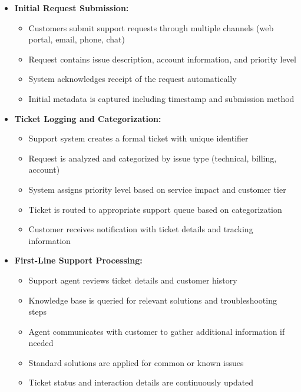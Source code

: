 \begin{itemize}
    \item \textbf{Initial Request Submission:}
    \begin{itemize}
        \item Customers submit support requests through multiple channels (web portal, email, phone, chat)
        \item Request contains issue description, account information, and priority level
        \item System acknowledges receipt of the request automatically
        \item Initial metadata is captured including timestamp and submission method
    \end{itemize}

    \item \textbf{Ticket Logging and Categorization:}
    \begin{itemize}
        \item Support system creates a formal ticket with unique identifier
        \item Request is analyzed and categorized by issue type (technical, billing, account)
        \item System assigns priority level based on service impact and customer tier
        \item Ticket is routed to appropriate support queue based on categorization
        \item Customer receives notification with ticket details and tracking information
    \end{itemize}

    \item \textbf{First-Line Support Processing:}
    \begin{itemize}
        \item Support agent reviews ticket details and customer history
        \item Knowledge base is queried for relevant solutions and troubleshooting steps
        \item Agent communicates with customer to gather additional information if needed
        \item Standard solutions are applied for common or known issues
        \item Ticket status and interaction details are continuously updated
    \end{itemize}


\end{itemize}
